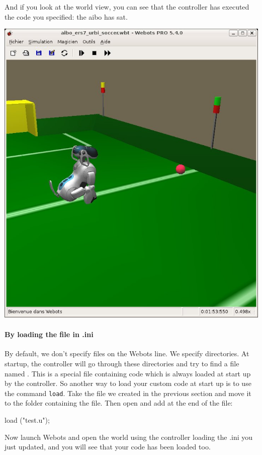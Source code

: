 And if you look at the world view, you can see that the controller has
executed the \urbi code you specified: the aibo has sat.

\begin{center}
  \includegraphics[width=.8\linewidth]{img/webots/aibo-sat}
\end{center}



\paragraph{By loading the file in \urbi.ini}
\label{webots.firstrun.loadprograms.inurbiinifile}

By default, we don't specify files on the Webots 
line. We specify directories.  At startup, the \urbi controller will
go through these directories and try to find a file named
. This is a special file containing \us code
which is always loaded at start up by the \urbi controller. So another
way to load your custom \urbi code at start up is to use the command
\lstinline|load|.  Take the  file we created in the previous
section and move it to the folder containing the 
file. Then open  and add at the end of the file:

\begin{urbifixme}
load ("test.u");
\end{urbifixme}
Now launch Webots and open the world using the \urbi controller loading
the \urbi.ini you just updated, and you will see that your code has
been loaded too.


